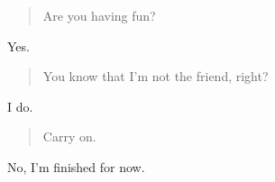 \begin{quote}
Are you having fun?
\end{quote}

Yes.

\begin{quote}
You know that I'm not the friend, right?
\end{quote}

I do.

\begin{quote}
Carry on.
\end{quote}

No, I'm finished for now.
